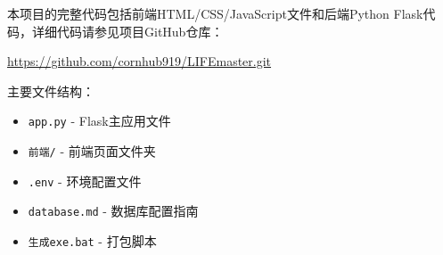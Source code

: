 \documentclass[a4paper]{article}
\begin{document}
本项目的完整代码包括前端HTML/CSS/JavaScript文件和后端Python Flask代码，详细代码请参见项目GitHub仓库：

\url{https://github.com/cornhub919/LIFEmaster.git}

主要文件结构：
\begin{itemize}
    \item \texttt{app.py} - Flask主应用文件
    \item \texttt{前端/} - 前端页面文件夹
    \item \texttt{.env} - 环境配置文件
    \item \texttt{database.md} - 数据库配置指南
    \item \texttt{生成exe.bat} - 打包脚本
\end{itemize}
\end{document}
